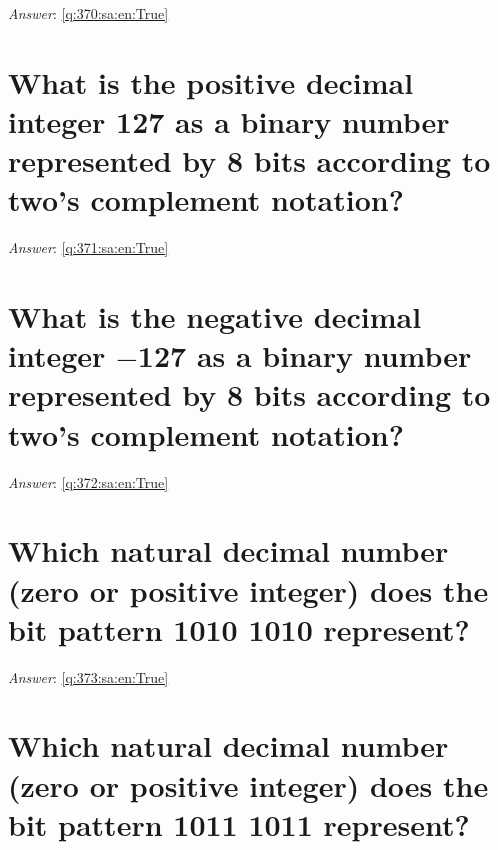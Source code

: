\documentclass[a4paper,11pt,oneside]{book}
\begin{document}
\begin{sloppypar}
\textit{Answer}: \autoref{q:370:sa:en:True}



\section{What is the positive decimal integer 127 as a binary number represented by 8 bits according to two's complement notation?}

\label{q:371:sa:en:False}

\vspace{2cm}

\noindent\makebox[\textwidth]{\hrulefill}

\vspace{1cm}

\textit{Answer}: \autoref{q:371:sa:en:True}



\section{What is the negative decimal integer \ensuremath{-}127 as a binary number represented by 8 bits according to two's complement notation?}

\label{q:372:sa:en:False}

\vspace{2cm}

\noindent\makebox[\textwidth]{\hrulefill}

\vspace{1cm}

\textit{Answer}: \autoref{q:372:sa:en:True}



\section{Which natural decimal number (zero or positive integer) does the bit pattern 1010 1010 represent?}

\label{q:373:sa:en:False}

\vspace{2cm}

\noindent\makebox[\textwidth]{\hrulefill}

\vspace{1cm}

\textit{Answer}: \autoref{q:373:sa:en:True}



\section{Which natural decimal number (zero or positive integer) does the bit pattern 1011 1011 represent?}


\end{sloppypar}
\end{document}
